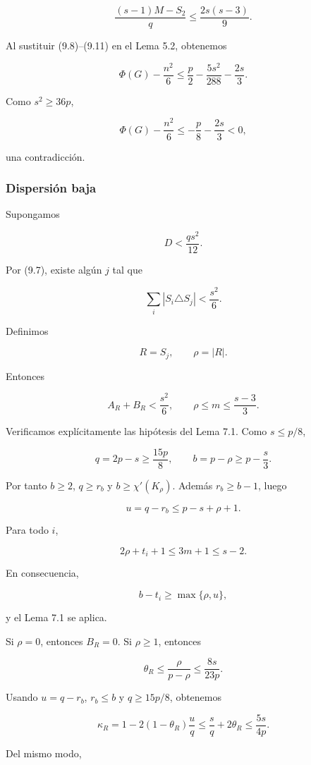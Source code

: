\documentclass[
  11pt,
]{article}
\begin{document}
\[
\frac{(s-1)M-S_2}{q}
\le
\frac{2s(s-3)}9.
\tag{9.11}
\]

Al sustituir (9.8)--(9.11) en el Lema 5.2, obtenemos

\[
\Phi(G)-\frac{n^2}{6}
\le
\frac p2-\frac{5s^2}{288}-\frac{2s}{3}.
\tag{9.12}
\]

Como \(s^2\ge36p\),

\[
\Phi(G)-\frac{n^2}{6}
\le
-\frac p8-\frac{2s}{3}<0,
\]

una contradicción.

\subsubsection{Dispersión baja}\label{dispersiuxf3n-baja}

Supongamos

\[
D<\frac{qs^2}{12}.
\tag{9.13}
\]

Por (9.7), existe algún \(j\) tal que

\[
\sum_i|S_i\triangle S_j|
<
\frac{s^2}{6}.
\tag{9.14}
\]

Definimos

\[
R=S_j,
\qquad
\rho=|R|.
\]

Entonces

\[
A_R+B_R<\frac{s^2}{6},
\qquad
\rho\le m\le\frac{s-3}{3}.
\tag{9.15}
\]

Verificamos explícitamente las hipótesis del Lema 7.1. Como
\(s\le p/8\),

\[
q=2p-s\ge\frac{15p}{8},
\qquad
b=p-\rho\ge p-\frac s3.
\]

Por tanto \(b\ge2\), \(q\ge r_b\) y \(b\ge\chi'(K_\rho)\). Además
\(r_b\ge b-1\), luego

\[
u=q-r_b\le p-s+\rho+1.
\]

Para todo \(i\),

\[
2\rho+t_i+1
\le
3m+1
\le
s-2.
\]

En consecuencia,

\[
b-t_i\ge\max\{\rho,u\},
\]

y el Lema 7.1 se aplica.

Si \(\rho=0\), entonces \(B_R=0\). Si \(\rho\ge1\), entonces

\[
\theta_R
\le
\frac{\rho}{p-\rho}
\le
\frac{8s}{23p}.
\]

Usando \(u=q-r_b\), \(r_b\le b\) y \(q\ge15p/8\), obtenemos

\[
\kappa_R
=1-2(1-\theta_R)\frac uq
\le
\frac sq+2\theta_R
\le
\frac{5s}{4p}.
\tag{9.16}
\]

Del mismo modo,
\end{document}
